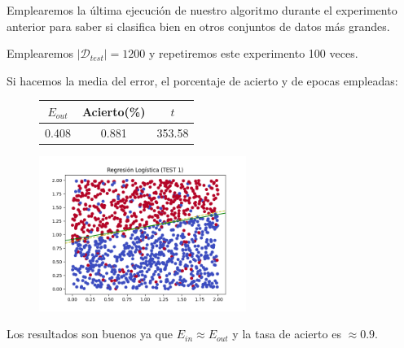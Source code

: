 \documentclass{article}
\begin{document}
    Emplearemos la última ejecución de nuestro algoritmo durante el experimento anterior
    para saber si clasifica bien en otros conjuntos de datos más grandes.

    Emplearemos $|\mathcal{D}_{test}| = 1200$ y repetiremos este experimento 100 veces.

    Si hacemos la media del error, el porcentaje de acierto y de epocas empleadas:

    \begin{figure}[h]
        \centering
        \begin{tabular}{ |c|c|c| }
            \hline
            $E_{out}$ & Acierto(\%) & $t$ \\
            \hline
            0.408 & 0.881 & 353.58 \\
            \hline
        \end{tabular}
    \end{figure}

    \begin{figure}[h]
        \centering
        \includegraphics[width=0.6\textwidth]{rl7.png}
    \end{figure}

    Los resultados son buenos ya que $E_{in} \approx E_{out}$ y la tasa de acierto es $\approx 0.9$.
\end{document}
